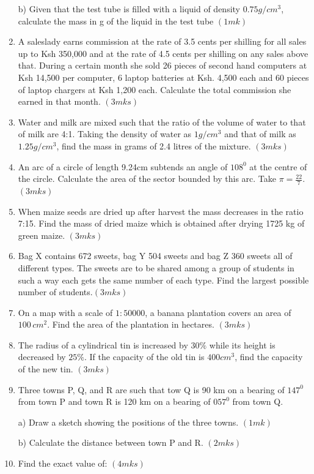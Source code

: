 \documentclass[
  a4paperpaper,
]{scrbook}
\begin{document}
\begin{tcolorbox}
\begin{enumerate}
  b) Given that the test tube is filled with a liquid of density
  \(0.75 g/cm^3\), calculate the mass in g of the liquid in the test
  tube \((1mk)\)
\item
  A saleslady earns commission at the rate of 3.5 cents per shilling for
  all sales up to Ksh 350,000 and at the rate of 4.5 cents per shilling
  on any sales above that. During a certain month she sold 26 pieces of
  second hand computers at Ksh 14,500 per computer, 6 laptop batteries
  at Ksh. 4,500 each and 60 pieces of laptop chargers at Ksh 1,200 each.
  Calculate the total commission she earned in that month. \((3mks)\)
\item
  Water and milk are mixed such that the ratio of the volume of water to
  that of milk are 4:1. Taking the density of water as \(1g/cm^3\) and
  that of milk as \(1.25g/cm^3\), find the mass in grams of 2.4 litres
  of the mixture. \((3mks)\)
\item
  An arc of a circle of length 9.24cm subtends an angle of \(108^0\) at
  the centre of the circle. Calculate the area of the sector bounded by
  this arc. Take \(\pi=\frac{22}{7}\). \((3mks)\)
\item
  When maize seeds are dried up after harvest the mass decreases in the
  ratio 7:15. Find the mass of dried maize which is obtained after
  drying 1725 kg of green maize. \((3mks)\)
\item
  Bag X contains 672 sweets, bag Y 504 sweets and bag Z 360 sweets all
  of different types. The sweets are to be shared among a group of
  students in such a way each gets the same number of each type. Find
  the largest possible number of students.\((3mks)\)
\item
  On a map with a scale of \(1:50000\), a banana plantation covers an
  area of \(100\,cm^2\). Find the area of the plantation in hectares.
  \((3mks)\)
\item
  The radius of a cylindrical tin is increased by \(30\%\) while its
  height is decreased by \(25\%\). If the capacity of the old tin is
  \(400 cm^3\), find the capacity of the new tin. \((3mks)\)
\item
  Three towns P, Q, and R are such that tow Q is 90 km on a bearing of
  \(147^0\) from town P and town R is 120 km on a bearing of \(057^0\)
  from town Q.

  a) Draw a sketch showing the positions of the three towns. \((1mk)\)

  b) Calculate the distance between town P and R. \((2mks)\)
\item
  Find the exact value of: \((4mks)\)


\end{enumerate}
\end{tcolorbox}
\end{document}
